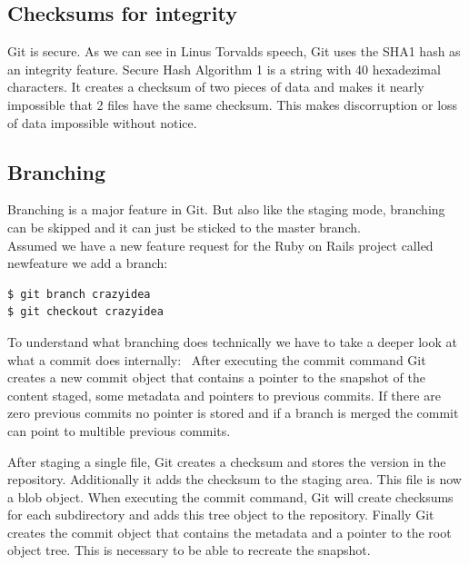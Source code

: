 \subsection{Checksums for integrity}

 \cite{googletechtalk2007}

Git is secure. As we can see in Linus Torvalds speech, Git uses the SHA1 hash
as an integrity feature. Secure Hash Algorithm 1 is a string with 40 hexadezimal
characters. It creates a checksum of two pieces of data and makes it nearly
impossible that 2 files have the same checksum. This makes discorruption or loss
of data impossible without notice. \cite[chapter 1.3]{gitpro2009}

\subsection {Branching}

Branching is a major feature in Git. But also like the staging mode,
branching can be skipped and it can just be sticked to the master
branch. \\
Assumed we have a new feature request for the Ruby on Rails project called
newfeature we add a branch:
\begin{lstlisting}
$ git branch crazyidea
$ git checkout crazyidea
\end{lstlisting}

To understand what branching does technically we have to take a deeper look at
what a commit does internally: \
After executing the commit command Git creates a new commit object that
contains a pointer to the snapshot of the content staged, some metadata and
pointers to previous commits. If there are zero previous commits no pointer
is stored and if a branch is merged the commit can point to multible previous commits.

After staging a single file, Git creates a checksum and stores the version in the repository. Additionally it adds the
checksum to the staging area. This file is now a blob object.
When executing the commit command, Git will create checksums for each
subdirectory and adds this tree object to the repository. Finally Git creates
the commit object that contains the metadata and a pointer to the root object
tree. This is necessary to be able to recreate the snapshot.

